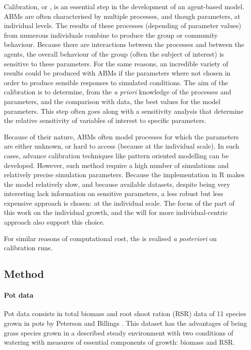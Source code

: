 Calibration, or , is an essential step in the development of an agent-based model. ABMs are often characterised by multiple processes, and though parameters, at individual levels. The results of these processes (depending of parameter values) from numerous individuals combine to produce the group or community behaviour. Because there are interactions between the processes and between the agents, the overall behaviour of the group (often the subject of interest) is sensitive to these parameters. For the same reasons, an incredible variety of results could be produced with ABMs if the parameters where not chosen in order to produce sensible responses to simulated conditions. The aim of the calibration is to determine, from the \textit{a priori} knowledge of the processes and parameters, and the comparison with data, the best values for the model parameters. This step often goes along with a sensitivity analysis that determine the relative sensitivity of variables of interest to specific parameters.

Because of their nature, ABMs often model processes for which the parameters are either unknown, or hard to access (because at the individual scale). In such cases, advance calibration techniques like pattern oriented modelling\parencite{grimm_pattern-oriented_2005, hartig} can be developed. However, such method require a high number of simulations and relatively precise simulation parameters. Because the implementation in R makes the model relatively slow, and because available datasets, despite being very interesting lack information on sensitive parameters, a less robust but less expensive approach is chosen:  at the individual scale. The focus of the part of this work on the individual growth, and the will for more individual-centric approach also support this choice.

 For similar reasons of computational cost, the  is  realised \textit{a posteriori} on calibration runs.

\subsection{Method}

\paragraph{Pot data}
Pot data consists in total biomass and root shoot ration (RSR) data of 11 species grown in pots by Peterson and Billings \parencite{peterson_growth_1982}. This dataset has the advantages of being grass species grown in a described steady environment with two conditions of watering with measures of essential components of growth: biomass and RSR.

